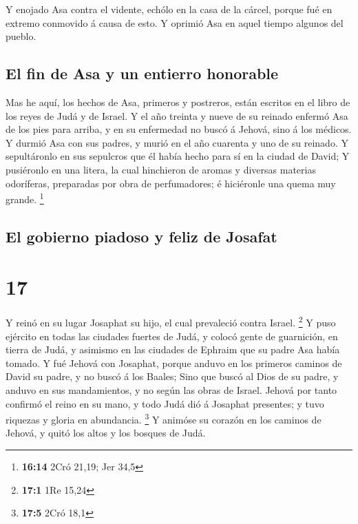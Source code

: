  Y enojado Asa contra el vidente, echólo en la casa de la
cárcel, porque fué en extremo conmovido á causa de esto. Y oprimió Asa
en aquel tiempo algunos del pueblo.

\hypertarget{el-fin-de-asa-y-un-entierro-honorable}{%
\subsection{El fin de Asa y un entierro
honorable}\label{el-fin-de-asa-y-un-entierro-honorable}}

 Mas he aquí, los hechos de Asa, primeros y postreros,
están escritos en el libro de los reyes de Judá y de Israel.
 Y el año treinta y nueve de su reinado enfermó Asa de
los pies para arriba, y en su enfermedad no buscó á Jehová, sino á los
médicos.  Y durmió Asa con sus padres, y murió en el año
cuarenta y uno de su reinado.  Y sepultáronlo en sus
sepulcros que él había hecho para sí en la ciudad de David; Y pusiéronlo
en una litera, la cual hinchieron de aromas y diversas materias
odoríferas, preparadas por obra de perfumadores; é hiciéronle una quema
muy grande. \footnote{\textbf{16:14} 2Cró 21,19; Jer 34,5}

\hypertarget{el-gobierno-piadoso-y-feliz-de-josafat}{%
\subsection{El gobierno piadoso y feliz de
Josafat}\label{el-gobierno-piadoso-y-feliz-de-josafat}}

\hypertarget{section-16}{%
\section{17}\label{section-16}}

 Y reinó en su lugar Josaphat su hijo, el cual prevaleció
contra Israel. \footnote{\textbf{17:1} 1Re 15,24}  Y puso
ejército en todas las ciudades fuertes de Judá, y colocó gente de
guarnición, en tierra de Judá, y asimismo en las ciudades de Ephraim que
su padre Asa había tomado.  Y fué Jehová con Josaphat,
porque anduvo en los primeros caminos de David su padre, y no buscó á
los Baales;  Sino que buscó al Dios de su padre, y anduvo
en sus mandamientos, y no según las obras de Israel. 
Jehová por tanto confirmó el reino en su mano, y todo Judá dió á
Josaphat presentes; y tuvo riquezas y gloria en abundancia. \footnote{\textbf{17:5}
  2Cró 18,1}  Y animóse su corazón en los caminos de
Jehová, y quitó los altos y los bosques de Judá.

